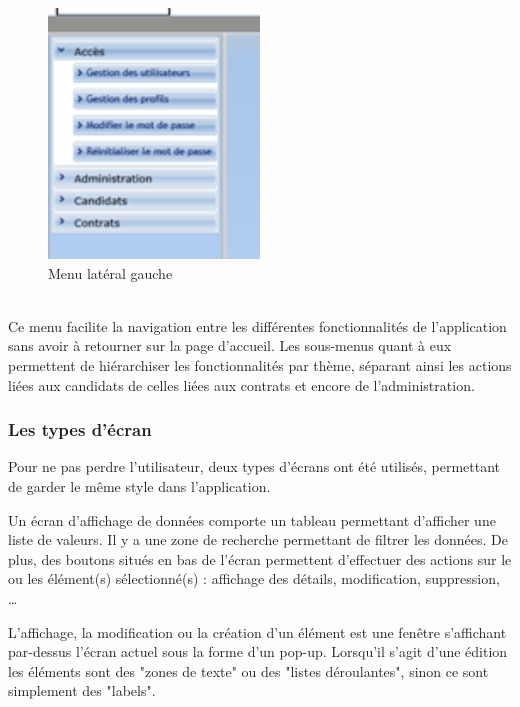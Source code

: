\begin{figure}[!h]
	\center
	\includegraphics[width=0.5\textwidth]{img/menu.png}
	\caption{Menu latéral gauche}
	\label{menu}
\end{figure}
~~\\

Ce menu facilite la navigation entre les différentes fonctionnalités de l'application sans avoir à retourner sur la page d'accueil.
Les sous-menus quant à eux permettent de hiérarchiser les fonctionnalités par thème, séparant ainsi les actions liées aux candidats de celles liées aux contrats et encore de l'administration.


\subsubsection{Les types d'écran}

Pour ne pas perdre l'utilisateur, deux types d'écrans ont été utilisés, permettant de garder le même style dans l'application.

Un écran d'affichage de données comporte un tableau permettant d'afficher une liste de valeurs.
Il y a une zone de recherche permettant de filtrer les données.
De plus, des boutons situés en bas de l'écran permettent d'effectuer des actions sur le ou les élément(s) sélectionné(s) : affichage des détails, modification, suppression, \ldots

L'affichage, la modification ou la création d'un élément est une fenêtre s'affichant par-dessus l'écran actuel sous la forme d'un pop-up.
Lorsqu'il s'agit d'une édition les éléments sont des "zones de texte" ou des "listes déroulantes", sinon ce sont simplement des "labels".


